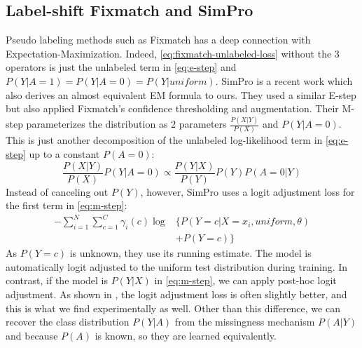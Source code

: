 \subsection{Label-shift Fixmatch and SimPro}
\label{subsec:simpro}
Pseudo labeling methods such as Fixmatch has a deep connection with Expectation-Maximization. Indeed, \cref{eq:fixmatch-unlabeled-loss} without the 3 operators is just the unlabeled term in \cref{eq:e-step} and $P(Y|A=1) = P(Y|A=0) = P(Y|\textit{uniform})$. SimPro is a recent work which also derives an almost equivalent EM formula to ours. They used a similar E-step but also applied Fixmatch's confidence thresholding and augmentation. Their M-step parameterizes the distribution as 2 parameters $\frac{P(X|Y)}{P(X)}$ and $P(Y|A=0)$. This is just another decomposition of the unlabeled log-likelihood term in \cref{eq:e-step} up to a constant $P(A=0)$:
\begin{equation}
\frac{P(X|Y)}{P(X)} P(Y|A=0) 
\propto \frac{P(Y|X)}{P(Y)}P(Y) P(A=0|Y)
\label{eq:equi-simpro}
\end{equation}
Instead of canceling out $P(Y)$, however, SimPro uses a logit adjustment loss \cite{logitadjustment} for the first term in \cref{eq:m-step}:
\vspace*{-.1in}
\begin{equation}
\begin{aligned}
- \sum_{i=1}^N \sum_{c=1}^C \gamma_i(c) \log &\Big\{P(Y=c|X=x_i,\textit{uniform},\theta) \\
&+ P(Y=c)\Big\}
\end{aligned}
\label{eq:simpro-la-loss}
\end{equation}
As $P(Y=c)$ is unknown, they use its running estimate. The model is automatically logit adjusted to the uniform test distribution during training. In contrast, if the model is $P(Y|X)$ in \cref{eq:m-step}, we can apply post-hoc logit adjustment. As shown in \cite{logitadjustment}, the logit adjustment loss is often slightly better, and this is what we find experimentally as well. Other than this difference, we can recover the class distribution $P(Y|A)$ from the missingness mechanism $P(A|Y)$ and because $P(A)$ is known, so they are learned equivalently.


